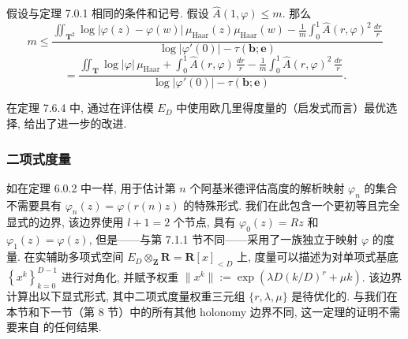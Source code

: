 \begin{theorem}\label{thm:7.1.10}
假设与定理 7.0.1 相同的条件和记号. 假设 \(\widehat{A}(1,\varphi) \leq m\). 那么
\begin{equation}\label{eq:7.1.11}
m \leq \frac{\iint_{\mathbf{T}^{2}} \log |\varphi(z) - \varphi(w)| \, \mu_{\mathrm{Haar}}(z) \mu_{\mathrm{Haar}}(w) - \frac{1}{m} \int_{0}^{1} \widehat{A}(r,\varphi)^{2} \, \frac{dr}{r}}{\log |\varphi'(0)| - \tau(\mathbf{b}; \mathbf{e})}
\end{equation}
\[ = \frac{\iint_{\mathbf{T}} \log |\varphi| \, \mu_{\mathrm{Haar}} + \int_{0}^{1} \widehat{A}(r,\varphi) \, \frac{dr}{r} - \frac{1}{m} \int_{0}^{1} \widehat{A}(r,\varphi)^{2} \, \frac{dr}{r}}{\log |\varphi'(0)| - \tau(\mathbf{b}; \mathbf{e})}. \]
\end{theorem}

在定理 7.6.4 中, 通过在评估模 \(E_D\) 中使用欧几里得度量的（启发式而言）最优选择, 给出了进一步的改进.

\subsubsection{二项式度量}\label{sec:7.1.12}

如在定理 6.0.2 中一样, 用于估计第 \(n\) 个阿基米德评估高度的解析映射 \(\varphi_n\) 的集合不需要具有 \(\varphi_n(z) = \varphi(r(n)z)\) 的特殊形式. 
我们在此包含一个更初等且完全显式的边界, 该边界使用 \(l+1=2\) 个节点, 
具有 \(\varphi_0(z)=Rz\) 和 \(\varphi_1(z)=\varphi(z)\), 
但是——与第 7.1.1 节不同——采用了一族独立于映射 \(\varphi\) 的度量. 
在实辅助多项式空间 \(E_D \otimes_{\mathbf{Z}} \mathbf{R} = \mathbf{R}[x]_{< D}\) 上, 
度量可以描述为对单项式基底 \(\left\{x^k\right\}_{k=0}^{D-1}\) 进行对角化, 
并赋予权重 \(\|x^k\|:=\exp\left(\lambda D(k/D)^r+\mu k\right)\). 
该边界计算出以下显式形式, 其中二项式度量权重三元组 \(\{r,\lambda,\mu\}\) 是待优化的. 
与我们在本节和下一节（第 8 节）中的所有其他 holonomy 边界不同, 
这一定理的证明不需要来自 \cite{BC22} 的任何结果.

